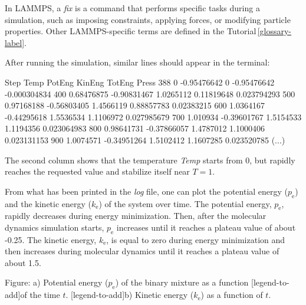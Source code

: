 \begin{tcolorbox}[colback=mylightblue!5!white,colframe=mylightblue!75!black,title=What is a fix?]

\vspace{0.25cm} \noindent In LAMMPS, a \textit{fix} is a command that performs specific tasks during a simulation,
such as imposing constraints, applying forces, or modifying particle properties.
Other LAMMPS-specific terms are defined in the Tutorial\,\ref{glossary-label}.
\end{tcolorbox}

\noindent After running the simulation, similar lines should appear in the terminal:

\begin{lcverbatim}
Step   Temp          PotEng         KinEng       TotEng        Press     
388    0             -0.95476642    0           -0.95476642   -0.000304834
400    0.68476875    -0.90831467    1.0265112    0.11819648    0.023794293  
500    0.97168188    -0.56803405    1.4566119    0.88857783    0.02383215   
600    1.0364167     -0.44295618    1.5536534    1.1106972     0.027985679  
700    1.010934      -0.39601767    1.5154533    1.1194356     0.023064983  
800    0.98641731    -0.37866057    1.4787012    1.1000406     0.023131153  
900    1.0074571     -0.34951264    1.5102412    1.1607285     0.023520785 
(...)
\end{lcverbatim}

\noindent The second column shows that the temperature \textit{Temp}
starts from 0, but rapidly reaches the
requested value and stabilize itself near $T=1$. 

\vspace{0.25cm} \noindent From what has been printed in the \textit{log} file, one can
plot the potential energy ($p_\text{e}$)
and the kinetic energy ($k_\text{e}$) of
the system over time. The potential energy, $p_\text{e}$, rapidly
decreases during energy minimization. Then, after the molecular dynamics
simulation starts, $p_\text{e}$ increases until it reaches a plateau
value of about -0.25. The kinetic energy, $k_\text{e}$, is equal to
zero during energy minimization and then increases during molecular
dynamics until it reaches a plateau value of about 1.5.

\vspace{0.25cm} Figure: a) Potential energy ($p_\text{e}$) of the binary mixture as a function
[legend-to-add]of the time $t$.
[legend-to-add]b) Kinetic energy ($k_\text{e}$) as a function of $t$.

